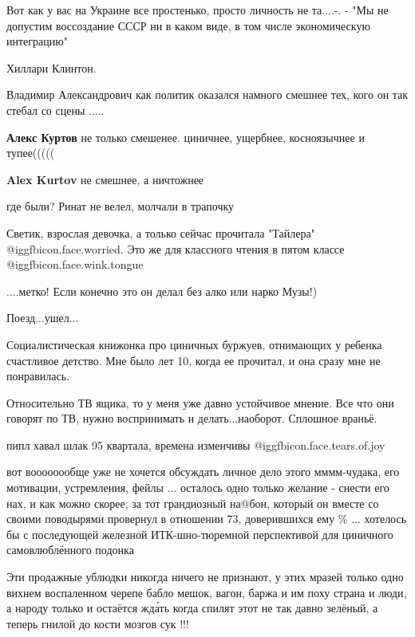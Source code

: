 \begin{itemize}
Вот как у вас на Украине все простенько, просто личность не та....-.
-
"Мы не допустим воссоздание СССР ни в каком виде, в том числе экономическую
интеграцию"

Хиллари Клинтон.

Владимир Александрович как политик оказался намного смешнее тех, кого он так стебал со сцены .....

\begin{itemize} %
\textbf{Алекс Куртов} не только смешенее. циничнее, ущербнее, косноязычнее и тупее(((((

\textbf{Alex Kurtov} не смешнее, а ничтожнее
\end{itemize} %

где были? Ринат не велел, молчали в трапочку


Светик, взрослая девочка, а только сейчас прочитала "Тайлера"  @igg{fbicon.face.worried}. 
Это же для классного чтения в пятом классе @igg{fbicon.face.wink.tongue} 

....метко! Если конечно это он делал без алко или нарко Музы!)

Поезд...ушел...


Социалистическая книжонка про циничных буржуев, отнимающих у ребенка счастливое
детство. Мне было лет 10, когда ее прочитал, и она сразу мне не понравилась.

Относительно ТВ ящика, то у меня уже давно устойчивое мнение.
Все что они говорят по ТВ, нужно воспринимать и делать...наоборот.
Сплошное враньё.

пипл хавал шлак 95 квартала, времена изменчивы @igg{fbicon.face.tears.of.joy} 


вот воооооообще уже не хочется обсуждать личное дело этого мммм-чудака, его
мотивации, устремления, фейлы ... осталось одно только желание - снести его
нах, и как можно скорее, за тот грандиозный на@бон, который он вместе со своими
поводырями провернул в отношении 73, доверившихся ему \% ... хотелось бы с
последующей железной ИТК-шно-тюремной перспективой для циничного
самовлюблённого подонка


Эти продажные ублюдки никогда ничего не признают, у этих мразей только одно
вихнем воспаленном черепе бабло мешок, вагон, баржа и им поху страна и люди,
а народу только и остаётся жда́ть когда спилят этот не так давно зелёный, а
теперь гнилой до кости мозгов сук !!!


\end{itemize}
